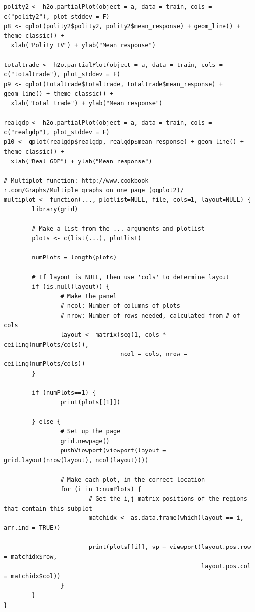 \documentclass[a4paper,12pt]{article}
\begin{document}
\begin{verbatim}
polity2 <- h2o.partialPlot(object = a, data = train, cols = c("polity2"), plot_stddev = F)
p8 <- qplot(polity2$polity2, polity2$mean_response) + geom_line() + theme_classic() +
  xlab("Polity IV") + ylab("Mean response")

totaltrade <- h2o.partialPlot(object = a, data = train, cols = c("totaltrade"), plot_stddev = F)
p9 <- qplot(totaltrade$totaltrade, totaltrade$mean_response) + geom_line() + theme_classic() +
  xlab("Total trade") + ylab("Mean response")

realgdp <- h2o.partialPlot(object = a, data = train, cols = c("realgdp"), plot_stddev = F)
p10 <- qplot(realgdp$realgdp, realgdp$mean_response) + geom_line() + theme_classic() +
  xlab("Real GDP") + ylab("Mean response")

# Multiplot function: http://www.cookbook-r.com/Graphs/Multiple_graphs_on_one_page_(ggplot2)/
multiplot <- function(..., plotlist=NULL, file, cols=1, layout=NULL) {
        library(grid)
        
        # Make a list from the ... arguments and plotlist
        plots <- c(list(...), plotlist)
        
        numPlots = length(plots)
        
        # If layout is NULL, then use 'cols' to determine layout
        if (is.null(layout)) {
                # Make the panel
                # ncol: Number of columns of plots
                # nrow: Number of rows needed, calculated from # of cols
                layout <- matrix(seq(1, cols * ceiling(numPlots/cols)),
                                 ncol = cols, nrow = ceiling(numPlots/cols))
        }
        
        if (numPlots==1) {
                print(plots[[1]])
                
        } else {
                # Set up the page
                grid.newpage()
                pushViewport(viewport(layout = grid.layout(nrow(layout), ncol(layout))))
                
                # Make each plot, in the correct location
                for (i in 1:numPlots) {
                        # Get the i,j matrix positions of the regions that contain this subplot
                        matchidx <- as.data.frame(which(layout == i, arr.ind = TRUE))
                        
                        print(plots[[i]], vp = viewport(layout.pos.row = matchidx$row,
                                                        layout.pos.col = matchidx$col))
                }
        }
}


\end{verbatim}
\end{document}

